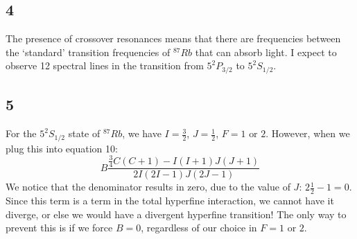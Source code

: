 \documentclass[12pt]{article}
\begin{document}
\subsection*{4}

The presence of crossover resonances means that there are frequencies between the `standard' transition frequencies of ${}^{87}Rb$ that can absorb light.  I expect to observe 12 spectral lines in the transition from $5^2P_{3/2}$ to $5^2S_{1/2}$.

\subsection*{5}

For the $5^2S_{1/2}$ state of ${}^{87}Rb$, we have $I = \frac{3}{2}$, $J = \frac{1}{2}$, $F = 1 \text{ or } 2$.  However, when we plug this into equation 10:
$$
B \frac{\frac{3}{4}C(C+1)-I(I+1)J(J+1)}{2I(2I-1)J(2J-1)}
$$
We notice that the denominator results in zero, due to the value of $J$: $2\frac{1}{2}-1=0$.  Since this term is a term in the total hyperfine interaction, we cannot have it diverge, or else we would have a divergent hyperfine transition!  The only way to prevent this is if we force $B=0$, regardless of our choice in $F = 1 \text{ or } 2$.
\end{document}
